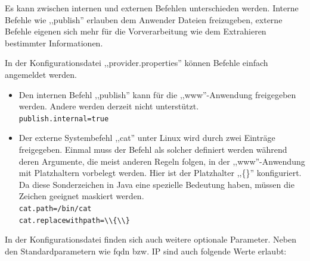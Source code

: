 \documentclass[oneside, ngerman, toc=bibliography,bibliography=totoc,listof=entryprefix, open=right,numbers=noenddot,fontsize=12pt]{scrbook}
\begin{document}
Es kann zwischen internen und externen Befehlen unterschieden werden.
Interne Befehle wie ,,publish'' erlauben dem Anwender Dateien freizugeben, externe Befehle eigenen sich mehr für die Vorverarbeitung wie dem Extrahieren bestimmter Informationen.

\bigskip
In der Konfigurationsdatei ,,provider.properties'' können Befehle einfach angemeldet werden.

\begin{itemize}
    \item Den internen Befehl ,,publish'' kann für die ,,www''-Anwendung freigegeben werden.
    Andere werden derzeit nicht unterstützt.\\
    \verb|publish.internal=true|
    
    \item Der externe Systembefehl ,,cat'' unter Linux wird durch zwei Einträge freigegeben. Einmal muss der Befehl als solcher definiert werden während deren Argumente, die meist anderen Regeln folgen, in der ,,www''-Anwendung mit Platzhaltern vorbelegt werden. Hier ist der Platzhalter ,,\{\}'' konfiguriert. Da  diese Sonderzeichen in Java eine spezielle Bedeutung haben, müssen die Zeichen geeignet maskiert werden.
    \\
    \verb|cat.path=/bin/cat|\\
    \verb|cat.replacewithpath=\\{\\}|
    
\end{itemize}

 

In der Konfigurationsdatei finden sich auch weitere optionale Parameter. Neben den Standardparametern wie \acrshort{fqdn} bzw. IP sind auch folgende Werte erlaubt:\\
\end{document}
